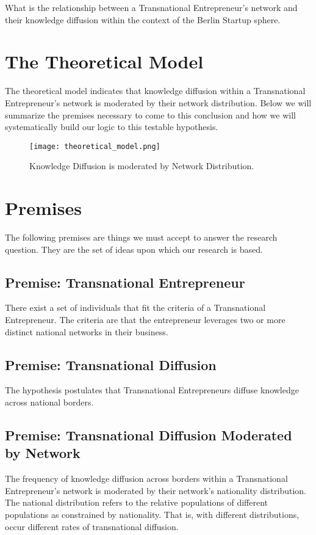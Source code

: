 What is the relationship between a Transnational Entrepreneur's network and their knowledge diffusion within the context of the Berlin Startup sphere.

\section{The Theoretical Model}
The theoretical model indicates that knowledge diffusion within a Transnational Entrepreneur's network is moderated by their network distribution. Below we will summarize the premises necessary to come to this conclusion and how we will systematically build our logic to this testable hypothesis.
\begin{figure}[!ht]
  \centering
  \texttt{[image: theoretical\_model.png]}
  \caption{Knowledge Diffusion is moderated by Network Distribution.}
\end{figure}

\section{Premises}
The following premises are things we must accept to answer the research question. They are the set of ideas upon which our research is based.
\subsection{Premise: Transnational Entrepreneur}
There exist a set of individuals that fit the criteria of a Transnational Entrepreneur. The criteria are that the entrepreneur leverages two or more distinct national networks in their business. 
\subsection{Premise: Transnational Diffusion}
The hypothesis postulates that Transnational Entrepreneurs diffuse knowledge across national borders.
\subsection{Premise: Transnational Diffusion Moderated by Network}
The frequency of knowledge diffusion across borders within a Transnational Entrepreneur's network is moderated by their network's nationality distribution. The national distribution refers to the relative populations of different populations as constrained by nationality. That is, with different distributions, occur different rates of transnational diffusion.

